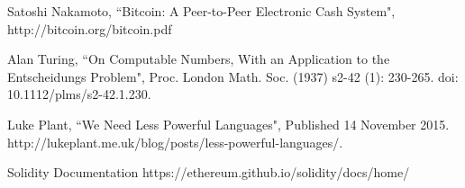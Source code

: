 \documentclass[letterpaper]{article}
\begin{document}
\begin{thebibliography}{9}

  Satoshi Nakamoto,
  ``Bitcoin: A Peer-to-Peer Electronic Cash System",
  http://bitcoin.org/bitcoin.pdf
  
  Alan Turing,
  ``On Computable Numbers, With an Application to the Entscheidungs Problem",
  Proc. London Math. Soc. (1937) s2-42 (1): 230-265.
  doi: 10.1112/plms/s2-42.1.230.
  
  Luke Plant,
  ``We Need Less Powerful Languages",
  Published 14 November 2015.
  http://lukeplant.me.uk/blog/posts/less-powerful-languages/.
  
  Solidity Documentation
  https://ethereum.github.io/solidity/docs/home/

\end{thebibliography}
  
\end{document}
